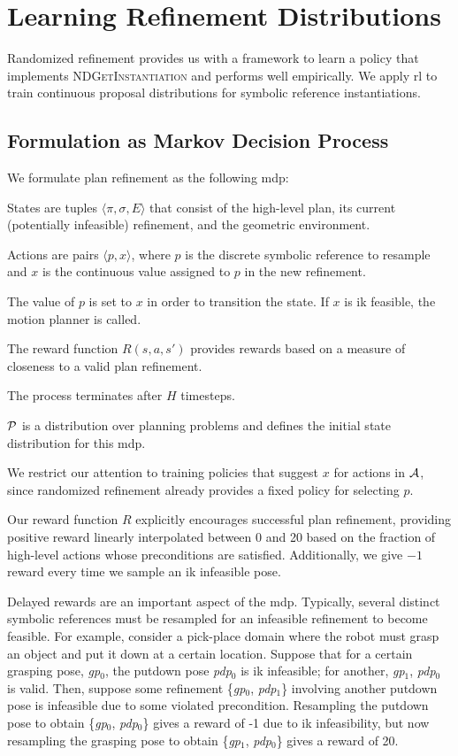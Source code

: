 \section{Learning Refinement Distributions}
Randomized refinement provides us with a framework to learn a policy that implements
\textsc{NDGetInstantiation} and performs well empirically. We apply {\sc rl}
to train continuous proposal distributions for symbolic reference instantiations.

\subsection{Formulation as Markov Decision Process}
We formulate plan refinement as the following {\sc mdp}:
\begin{tightlist}
\item States are tuples $\langle \pi, \sigma, E \rangle$ that consist of the
high-level plan, its current (potentially infeasible) refinement, and the
geometric environment.
\item Actions are pairs $\langle p, x \rangle$, where $p$ is the discrete symbolic
reference to resample and $x$ is the continuous value assigned to $p$ in the new refinement.
\item The value of $p$ is set to $x$ in order to transition the state. If $x$ is {\sc ik} feasible, the motion planner is called.
\item The reward function $R(s, a, s')$ provides rewards based on a measure of closeness to a valid plan refinement.
\item The process terminates after $H$ timesteps.
\item $\mathcal{P}$ is a distribution over planning problems and defines the initial state distribution for this {\sc mdp}.
\end{tightlist}

We restrict our attention to training policies that suggest $x$ for actions in $\mathcal{A}$, since
randomized refinement already provides a fixed policy for selecting $p$.

Our reward function $R$ explicitly encourages successful plan refinement, providing positive reward linearly
interpolated between 0 and 20 based on the fraction of high-level actions whose preconditions are
satisfied. Additionally, we give $-1$ reward every time we sample an {\sc ik} infeasible pose.

Delayed rewards are an important aspect of the {\sc mdp}. Typically, several distinct symbolic references
must be resampled for an infeasible refinement to become feasible. For example, consider a pick-place domain
where the robot must grasp an object and put it down at a certain location. Suppose that for a certain grasping
pose, \emph{gp$_{0}$}, the putdown pose \emph{pdp$_{0}$} is {\sc ik} infeasible; for another,
\emph{gp$_{1}$}, \emph{pdp$_{0}$} is valid.
Then, suppose some refinement \{\emph{gp$_{0}$}, \emph{pdp$_{1}$}\} involving another putdown pose is infeasible due to some violated precondition.
Resampling the putdown pose to obtain \{\emph{gp$_{0}$}, \emph{pdp$_{0}$}\} gives a reward of -1 due to {\sc ik}
infeasibility, but now resampling the grasping pose to obtain \{\emph{gp$_{1}$}, \emph{pdp$_{0}$}\} gives a reward of 20.

